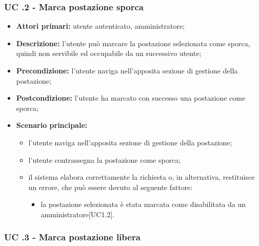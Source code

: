 \subsubsection{UC .2 - Marca postazione sporca}

\begin{itemize}
\item \textbf{Attori primari:} utente autenticato, amministratore;
\item \textbf{Descrizione:} l’utente può marcare la postazione selezionata come sporca, quindi non servibile ed occupabile da un successivo utente;
\item \textbf{Precondizione:} l’utente naviga nell’apposita sezione di gestione della postazione; 
\item \textbf{Postcondizione:} l’utente ha marcato con successo una postazione come sporca;
\item \textbf{Scenario principale:} 
	\begin{itemize}
		\item l’utente naviga nell’apposita sezione di gestione della postazione;		
		\item l’utente contrassegna la postazione come sporca;
		\item il sistema elabora correttamente la richiesta o, in alternativa, restituisce un errore, che può essere dovuto al seguente fattore:
		\begin{itemize}
			\item la postazione selezionata è stata marcata come disabilitata da un amministratore[UC1.2].
		\end{itemize}
	\end{itemize}
\end{itemize}
\newpage
\subsubsection{UC .3 - Marca postazione libera}

